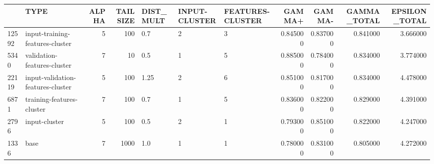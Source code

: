\begin{tabular}{llrrlllrrrr}
\toprule
 & TYPE & ALPHA & TAILSIZE & DIST_MULT & INPUT-CLUSTER & FEATURES-CLUSTER & GAMMA+ & GAMMA- & GAMMA_TOTAL & EPSILON_TOTAL \\
\midrule
12592 & input-training-features-cluster & 5 & 100 & 0.7 & 2 & 3 & 0.845000 & 0.837000 & 0.841000 & 3.666000 \\
5340 & validation-features-cluster & 7 & 10 & 0.5 & 1 & 5 & 0.885000 & 0.784000 & 0.834000 & 3.774000 \\
22119 & input-validation-features-cluster & 5 & 100 & 1.25 & 2 & 6 & 0.851000 & 0.817000 & 0.834000 & 4.478000 \\
6871 & training-features-cluster & 7 & 100 & 0.7 & 1 & 5 & 0.836000 & 0.822000 & 0.829000 & 4.391000 \\
2796 & input-cluster & 5 & 100 & 0.5 & 2 & 1 & 0.793000 & 0.851000 & 0.822000 & 4.247000 \\
1336 & base & 7 & 1000 & 1.0 & 1 & 1 & 0.780000 & 0.831000 & 0.805000 & 4.272000 \\
\bottomrule
\end{tabular}
